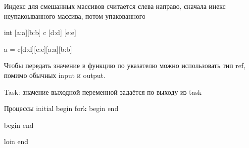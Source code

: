 \documentclass[a4paper, 12pt]{extarticle}
\begin{document}
Индекс для смешанных массивов  считается слева направо, сначала инекс неупакоыванного массива, потом упакованного

int [a:a][b:b] c [d:d] [e:e]

a = c[d:d][e:e][a:a][b:b]

Чтобы передать значение в функцию по указателю можно использовать тип ref, помимо обычных input и output.

Task: значение выходной переменной задаётся по выходу из task


Процессы
initial
	begin
		fork
			begin
			end
			
			begin
			end
		
		loin
	end
\end{document}
